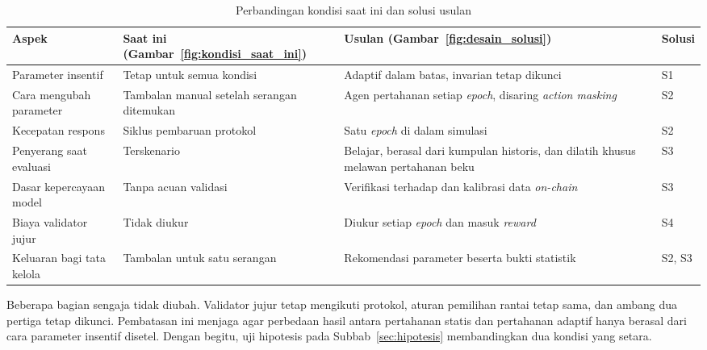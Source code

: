 \begin{table}[htbp]
\centering
\caption{Perbandingan kondisi saat ini dan solusi usulan}
\label{tab:before_after}
\small
\begin{tabular}{|p{2.4cm}|p{4.1cm}|p{4.4cm}|p{1.3cm}|}
\hline
\textbf{Aspek} & \textbf{Saat ini (Gambar~\ref{fig:kondisi_saat_ini})} & \textbf{Usulan (Gambar~\ref{fig:desain_solusi})} & \textbf{Solusi} \\
\hline
Parameter insentif & Tetap untuk semua kondisi & Adaptif dalam batas, invarian tetap dikunci & S1 \\
\hline
Cara mengubah parameter & Tambalan manual setelah serangan ditemukan & Agen pertahanan setiap \textit{epoch}, disaring \textit{action masking} & S2 \\
\hline
Kecepatan respons & Siklus pembaruan protokol & Satu \textit{epoch} di dalam simulasi & S2 \\
\hline
Penyerang saat evaluasi & Terskenario & Belajar, berasal dari kumpulan historis, dan dilatih khusus melawan pertahanan beku & S3 \\
\hline
Dasar kepercayaan model & Tanpa acuan validasi & Verifikasi terhadap \textcite{laneve2025stochastic} dan kalibrasi data \textit{on-chain} & S3 \\
\hline
Biaya validator jujur & Tidak diukur & Diukur setiap \textit{epoch} dan masuk \textit{reward} & S4 \\
\hline
Keluaran bagi tata kelola & Tambalan untuk satu serangan & Rekomendasi parameter beserta bukti statistik & S2, S3 \\
\hline
\end{tabular}
\end{table}

Beberapa bagian sengaja tidak diubah. Validator jujur tetap mengikuti protokol, aturan pemilihan rantai tetap sama, dan ambang dua pertiga tetap dikunci. Pembatasan ini menjaga agar perbedaan hasil antara pertahanan statis dan pertahanan adaptif hanya berasal dari cara parameter insentif disetel. Dengan begitu, uji hipotesis pada Subbab~\ref{sec:hipotesis} membandingkan dua kondisi yang setara.